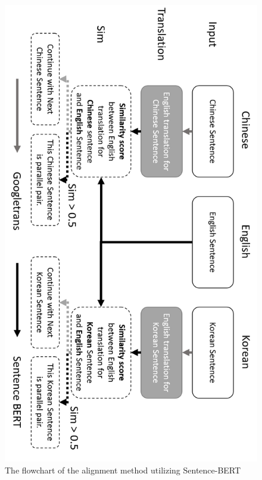 \documentclass[PhD]{PHlab-thesis}
\begin{document}
\begin{figure}[h!]
  \centering
  \includegraphics[width=0.75\linewidth]{fig_3_3.jpg}
  \captionsetup{type=figure}
  \caption{The flowchart of the alignment method utilizing Sentence-BERT}
  \label{fig:transcript}
\end{figure}
\end{document}
